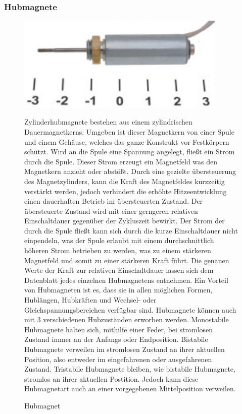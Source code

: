 \subsubsection{Hubmagnete}
\begin{figure}[H] 
\begin{center}

\includegraphics[width=10cm]{Bilder/Bauteile/Hubmagnet}
\caption{Hubmagnet}
\label{Hubmagnet}
Zylinderhubmagnete bestehen aus einem zylindrischen Dauermagnetkerns. Umgeben ist dieser Magnetkern von einer Spule und einem Gehäuse, welches das ganze Konstrukt vor Festkörpern schützt. Wird an die Spule eine Spannung angelegt, fließt ein Strom durch die Spule. Dieser Strom erzeugt ein Magnetfeld was den Magnetkern anzieht oder abstößt. Durch eine gezielte übersteuerung des Magnetzylinders, kann die Kraft des Magnetfeldes kurzzeitig verstärkt werden, jedoch verhindert die erhöhte Hitzeentwicklung einen dauerhaften Betrieb im übersteuerten Zustand. Der übersteuerte Zustand wird mit einer gerngeren relativen Einschaltdauer gegenüber der Zykluszeit bewirkt. Der Strom der durch die Spule fließt kann sich durch die kurze Einschaltdauer nicht einpendeln, was der Spule erlaubt mit einem durchschnittlich höheren Strom betrieben zu werden, was zu einem stärkeren Magnetfeld und somit zu einer stärkeren Kraft führt. Die genauen Werte der Kraft zur relativen Einschaltdauer lassen sich dem Datenblatt jedes einzelnen Hubmagnetens entnehmen. Ein Vorteil von Hubmagneten ist es, dass sie in allen möglichen Formen, Hublängen, Hubkräften und Wechsel- oder Gleichspannungsbereichen verfügbar sind. Hubmagnete können auch mit 3 verschiedenen Hubzuständen erworben werden. Monostabile Hubmagnete halten sich, mithilfe einer Feder, bei stromlosen Zustand immer an der Anfangs oder Endposition. Bistabile Hubmagnete verweilen im stromlosen Zustand an ihrer aktuellen Position, also entweder im eingefahrenen oder ausgefahrenen Zustand. Tristabile Hubmagnete bleiben, wie bistabile Hubmagnete, stromlos an ihrer aktuellen Postition. Jedoch kann diese Hubmagnetart auch an einer vorgegebenen Mittelposition verweilen.


\end{center}
\end{figure}
